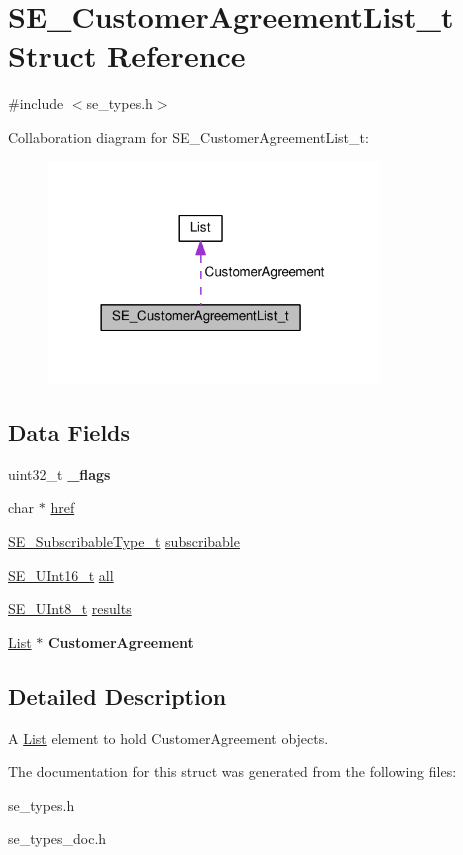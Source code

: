 \hypertarget{structSE__CustomerAgreementList__t}{}\section{S\+E\+\_\+\+Customer\+Agreement\+List\+\_\+t Struct Reference}
\label{structSE__CustomerAgreementList__t}


{\ttfamily \#include $<$se\+\_\+types.\+h$>$}



Collaboration diagram for S\+E\+\_\+\+Customer\+Agreement\+List\+\_\+t\+:\nopagebreak
\begin{figure}[H]
\begin{center}
\leavevmode
\includegraphics[width=249pt]{structSE__CustomerAgreementList__t__coll__graph}
\end{center}
\end{figure}
\subsection*{Data Fields}
\begin{DoxyCompactItemize}
\item 
uint32\+\_\+t {\bfseries \+\_\+flags}
\item 
char $\ast$ \hyperlink{group__CustomerAgreementList_ga348f726fc82b6d4af27eb7766a105ab4}{href}
\item 
\hyperlink{group__SubscribableType_ga5c41f553d369710ed34619266bf2551e}{S\+E\+\_\+\+Subscribable\+Type\+\_\+t} \hyperlink{group__CustomerAgreementList_ga2ef2422ab3fb511245e3411e4f267c4a}{subscribable}
\item 
\hyperlink{group__UInt16_gac68d541f189538bfd30cfaa712d20d29}{S\+E\+\_\+\+U\+Int16\+\_\+t} \hyperlink{group__CustomerAgreementList_ga26c15d5e4f56edc2498e136d2e70a88f}{all}
\item 
\hyperlink{group__UInt8_gaf7c365a1acfe204e3a67c16ed44572f5}{S\+E\+\_\+\+U\+Int8\+\_\+t} \hyperlink{group__CustomerAgreementList_ga6829ab0344621b1f9cd85785fd0b972e}{results}
\item 
\hyperlink{structList}{List} $\ast$ {\bfseries Customer\+Agreement}
\end{DoxyCompactItemize}


\subsection{Detailed Description}
A \hyperlink{structList}{List} element to hold Customer\+Agreement objects. 

The documentation for this struct was generated from the following files\+:\begin{DoxyCompactItemize}
\item 
se\+\_\+types.\+h\item 
se\+\_\+types\+\_\+doc.\+h\end{DoxyCompactItemize}
